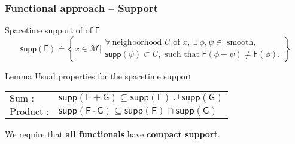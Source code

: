 \documentclass[9pt]{beamer}
\newcommand{\supp}{\mathsf{supp}} %
\newcommand{\Mcal}{\mathcal{M}}
\newcommand{\Fsf}{\mathsf{F}}
\newcommand{\Gsf}{\mathsf{G}}
\begin{document}
\begin{frame}

\frametitle{Functional approach -- Support}

\begin{block}{Spacetime support of of $\Fsf$}
%
\vspace*{-8pt}
%
\begin{equation*}
\supp(\Fsf) \doteq \left\{ x \in \Mcal \bigg| 
\begin{array}{l} 
\forall \ \mbox{neighborhood } U \mbox{ of } x, \ \exists \ \phi, \psi \in \mbox{ smooth}, \\
\supp(\psi) \subset U, \mbox{ such that } \Fsf(\phi + \psi) \neq \Fsf(\phi).
\end{array}
\right\}
\end{equation*}
%
\end{block}

\vfill

\begin{block}{Lemma}
Usual properties for the spacetime support
\begin{tabular}{ll}
\qquad $\mbox{Sum :}$ &  $\supp(\Fsf + \Gsf) \subseteq \supp(\Fsf) \cup \supp(\Gsf)$ \\
\qquad $\mbox{Product :}$ & $\supp(\Fsf \cdot \Gsf) \subseteq \supp(\Fsf) \cap \supp(\Gsf)$
\end{tabular}
\end{block}

\vfill

We require that \textbf{all functionals} have \textbf{compact support}.

\end{frame}

\end{document}
